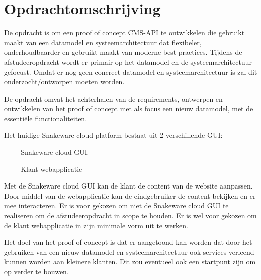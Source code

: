 \section{Opdrachtomschrijving}
\label{sec:Opdrachtomschrijving}
De opdracht is om een proof of concept CMS-API te ontwikkelen die gebruikt maakt van een datamodel en systeemarchitectuur dat flexibeler, onderhoudbaarder en gebruikt maakt van moderne best practices.
Tijdens de afstudeeropdracht wordt er primair op het datamodel en de systeemarchitectuur gefocust.
Omdat er nog geen concreet datamodel en systeemarchitectuur is zal dit onderzocht/ontworpen moeten worden.

\whitespace[2]
De opdracht omvat het achterhalen van de requirements, ontwerpen en ontwikkelen van het proof of concept met als focus een nieuw datamodel, met de essentiële functionaliteiten.

\whitespace[2]
Het huidige Snakeware cloud platform bestaat uit 2 verschillende \gls{GUI}:
\begin{itemize}
	\item[-] Snakeware cloud \gls{GUI}
	\item[-] Klant webapplicatie
\end{itemize}

\whitespace
Met de Snakeware cloud \gls{GUI} kan de klant de content van de website aanpassen.
Door middel van de webapplicatie kan de eindgebruiker de content bekijken en er mee interacteren.
Er is voor gekozen om niet de Snakeware cloud \gls{GUI} te realiseren om de afstudeeropdracht in scope te houden.
Er is wel voor gekozen om de klant webapplicatie in zijn minimale vorm uit te werken.

\whitespace[2]
Het doel van het proof of concept is dat er aangetoond kan worden dat door het gebruiken van een nieuw datamodel en systeemarchitectuur ook services verleend kunnen worden aan kleinere klanten.
Dit zou eventueel ook een startpunt zijn om op verder te bouwen.
%
%
